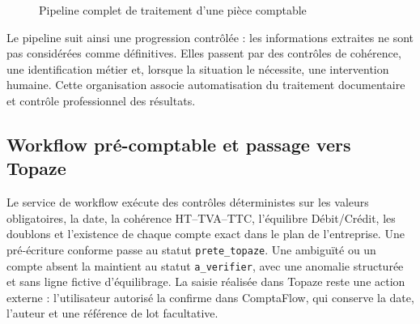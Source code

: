 \documentclass[12pt,a4paper,oneside]{report}
\begin{document}
\begin{figure}[htbp]
\caption{Pipeline complet de traitement d'une pièce comptable}
\label{fig:pipeline}
\end{figure}

Le pipeline suit ainsi une progression contrôlée : les informations extraites
ne sont pas considérées comme définitives. Elles passent par des contrôles de
cohérence, une identification métier et, lorsque la situation le nécessite,
une intervention humaine. Cette organisation associe automatisation du
traitement documentaire et contrôle professionnel des résultats.

\subsection{Workflow pré-comptable et passage vers Topaze}

Le service de workflow exécute des contrôles déterministes sur les valeurs
obligatoires, la date, la cohérence HT--TVA--TTC, l'équilibre Débit/Crédit, les
doublons et l'existence de chaque compte exact dans le plan de l'entreprise.
Une pré-écriture conforme passe au statut \texttt{prete\_topaze}. Une ambiguïté
ou un compte absent la maintient au statut \texttt{a\_verifier}, avec une
anomalie structurée et sans ligne fictive d'équilibrage. La saisie réalisée
dans Topaze reste une action externe : l'utilisateur autorisé la confirme dans
ComptaFlow, qui conserve la date, l'auteur et une référence de lot facultative.
\end{document}
